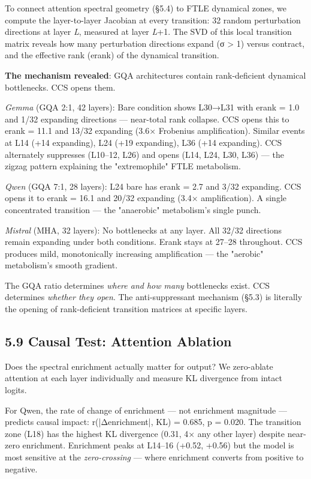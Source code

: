 \documentclass[12pt]{article}
\begin{document}
To connect attention spectral geometry (§5.4) to FTLE dynamical zones, we compute the layer-to-layer Jacobian at every transition: 32 random perturbation directions at layer \textit{L}, measured at layer \textit{L}+1. The SVD of this local transition matrix reveals how many perturbation directions expand (σ > 1) versus contract, and the effective rank (erank) of the dynamical transition.

\textbf{The mechanism revealed}: GQA architectures contain rank-deficient dynamical bottlenecks. CCS opens them.

\textit{Gemma} (GQA 2:1, 42 layers): Bare condition shows L30→L31 with erank = 1.0 and 1/32 expanding directions — near-total rank collapse. CCS opens this to erank = 11.1 and 13/32 expanding (3.6× Frobenius amplification). Similar events at L14 (+14 expanding), L24 (+19 expanding), L36 (+14 expanding). CCS alternately suppresses (L10–12, L26) and opens (L14, L24, L30, L36) — the zigzag pattern explaining the "extremophile" FTLE metabolism.

\textit{Qwen} (GQA 7:1, 28 layers): L24 bare has erank = 2.7 and 3/32 expanding. CCS opens it to erank = 16.1 and 20/32 expanding (3.4× amplification). A single concentrated transition — the "anaerobic" metabolism's single punch.

\textit{Mistral} (MHA, 32 layers): No bottlenecks at any layer. All 32/32 directions remain expanding under both conditions. Erank stays at 27–28 throughout. CCS produces mild, monotonically increasing amplification — the "aerobic" metabolism's smooth gradient.

The GQA ratio determines \textit{where and how many} bottlenecks exist. CCS determines \textit{whether they open}. The anti-suppressant mechanism (§5.3) is literally the opening of rank-deficient transition matrices at specific layers.

\subsection*{5.9 Causal Test: Attention Ablation}

Does the spectral enrichment actually matter for output? We zero-ablate attention at each layer individually and measure KL divergence from intact logits.

For Qwen, the rate of change of enrichment — not enrichment magnitude — predicts causal impact: r(|Δenrichment|, KL) = 0.685, p = 0.020. The transition zone (L18) has the highest KL divergence (0.31, 4× any other layer) despite near-zero enrichment. Enrichment peaks at L14–16 (+0.52, +0.56) but the model is most sensitive at the \textit{zero-crossing} — where enrichment converts from positive to negative.
\end{document}
